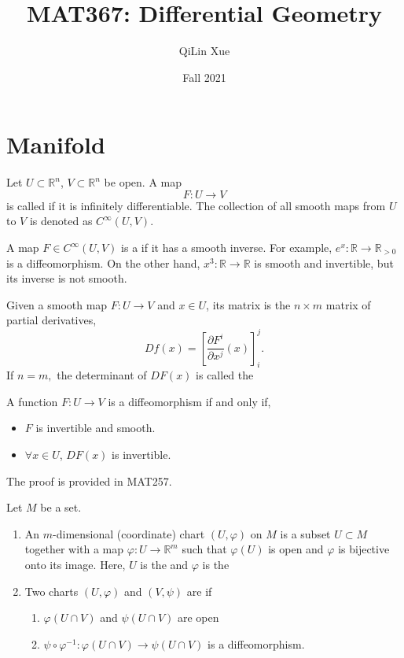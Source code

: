 \documentclass{article}
\title{MAT367: Differential Geometry}
\author{QiLin Xue}
\date{Fall 2021}
\numberwithin{equation}{section}
\begin{document}
\maketitle
\tableofcontents
\newpage
\section{Manifold}
\begin{definition}
    Let $U\subset \mathbb{R}^n$, $V\subset \mathbb{R}^n$ be open. A map
    \begin{equation}
        F: U \rightarrow V
    \end{equation}
    is called  if it is infinitely differentiable. The collection of all smooth maps from $U$ to $V$ is denoted as $C^\infty(U,V).$
\end{definition}
A map $F\in C^\infty(U,V)$ is a  if it has a smooth inverse. For example, $e^x: \mathbb{R} \to \mathbb{R}_{>0}$ is a diffeomorphism. On the other hand, $x^3: \mathbb{R} \to \mathbb{R}$ is smooth and invertible, but its inverse is not smooth.
\begin{definition}
    Given a smooth map $F:U\to V$ and $x\in U$, its  matrix is the $n\times m$ matrix of partial derivatives,
    \begin{equation}
        Df(x) = \left[ \frac{\partial F^i}{\partial x^j}(x)\right]_i^j.
    \end{equation} 
    If $n=m,$ the determinant of $DF(x)$ is called the 
\end{definition}
\begin{theorem}
     A function $F:U\to V$ is a diffeomorphism if and only if,
    \begin{itemize}
        \item $F$ is invertible and smooth.
        \item $\forall x\in U$, $DF(x)$ is invertible.
    \end{itemize}
\end{theorem}
The proof is provided in MAT257.
\begin{definition}
    Let $M$ be a set.
    \begin{enumerate}[label=(\alph*)]
        \item An $m$-dimensional (coordinate) chart $(U,\varphi)$ on $M$ is a subset $U \subset M$ together with a map $\varphi: U \rightarrow \mathbb{R}^m$ such that $\varphi(U)$ is open and $\varphi$ is bijective onto its image. Here, $U$ is the  and $\varphi$ is the 
        \item Two charts $(U,\varphi)$ and $(V,\psi)$ are  if
        \begin{enumerate}
            \item $\varphi(U \cap V)$ and $\psi(U \cap V)$ are open 
            \item $\psi \circ \varphi^{-1}: \varphi(U\cap V) \rightarrow \psi(U \cap V)$ is a diffeomorphism.
        \end{enumerate}
    \end{enumerate}
\end{definition}
\end{document}
